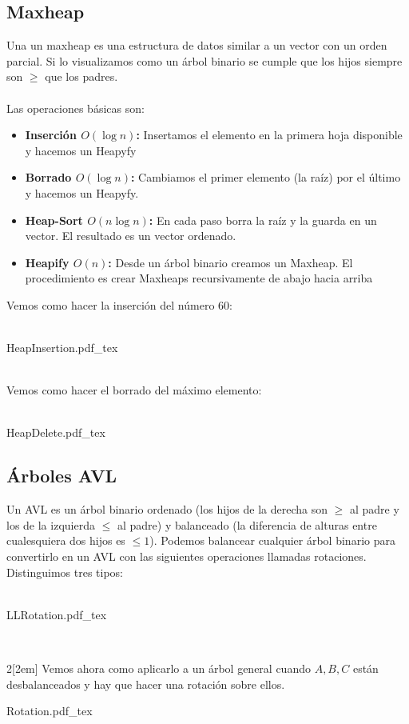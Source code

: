 \documentclass{myclass}
\newcommand{\incfig}[1]{%
  \begin{center}
  \def\svgwidth{0.9\columnwidth}
  {#1.pdf_tex}
  \end{center}
}
\begin{document}
\subsection{Maxheap}
Una un maxheap es una estructura de datos similar a un vector con un orden parcial. Si lo visualizamos como un árbol binario se cumple que los hijos siempre son $\ge $ que los padres.\\
\\
Las operaciones básicas son:
\begin{itemize}
  \item \textbf{Inserción $O(\log n)$:} Insertamos el elemento en la primera hoja disponible y hacemos un Heapyfy
  \item \textbf{Borrado $O(\log n)$:} Cambiamos el primer elemento (la raíz) por el último y hacemos un Heapyfy.
  \item \textbf{Heap-Sort $O(n\log n)$:} En cada paso borra la raíz y la guarda en un vector. El resultado es un vector ordenado.
  \item \textbf{Heapify $O(n)$:} Desde un árbol binario creamos un Maxheap. El procedimiento es crear Maxheaps recursivamente de abajo hacia arriba
\end{itemize}
Vemos como hacer la inserción del número $60$:\\
\\
\incfig{HeapInsertion}
\\
Vemos como hacer el borrado del máximo elemento:\\
\\
\incfig{HeapDelete}

\subsection{Árboles AVL}
Un AVL es un árbol binario ordenado (los hijos de la derecha son $\ge $ al padre y los de la izquierda $\le $ al padre) y balanceado (la diferencia de alturas entre cualesquiera dos hijos es $\le 1$). Podemos balancear cualquier árbol binario para convertirlo en un AVL con las siguientes operaciones llamadas rotaciones. Distinguimos tres tipos: \\
\\
\incfig{LLRotation}
\\
\begin{multicols}{2}[\columnsep2em]
\noindent
Vemos ahora como aplicarlo a un árbol general cuando $A, B, C$ están desbalanceados y hay que hacer una rotación sobre ellos.
\columnbreak
\incfig{Rotation}
\end{multicols}
\end{document}
